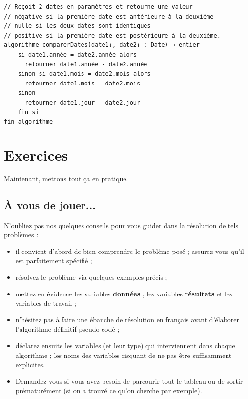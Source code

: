 \documentclass[11pt,a4paper]{article}
\begin{document}
            \par
        \begin{verbatim}
// Reçoit 2 dates en paramètres et retourne une valeur
// négative si la première date est antérieure à la deuxième
// nulle si les deux dates sont identiques
// positive si la première date est postérieure à la deuxième.
algorithme comparerDates(date1↓, date2↓ : Date) → entier
    si date1.année = date2.année alors
      retourner date1.année - date2.année
    sinon si date1.mois = date2.mois alors
      retourner date1.mois - date2.mois
    sinon
      retourner date1.jour - date2.jour
    fin si
fin algorithme
      \end{verbatim}\section{Exercices}
				Maintenant, mettons tout \c ca en pratique.
      
            \par
        \subsection{\`A vous de jouer...}
      N'oubliez pas nos quelques conseils pour vous guider dans la r\'esolution de tels probl\`emes :
      
					\begin{itemize}
				
			\item il convient d'abord de bien comprendre le probl\`eme pos\'e ; assurez-vous qu'il est parfaitement sp\'ecifi\'e ;
			\item r\'esolvez le probl\`eme via quelques exemples pr\'ecis ;
			\item mettez en \'evidence les variables \textbf{\guillemotleft  donn\'ees \guillemotright }, les variables \textbf{\guillemotleft  r\'esultats \guillemotright } et les variables de travail ;
			\item n'h\'esitez pas \`a faire une \'ebauche de r\'esolution en fran\c cais avant d'\'elaborer l'algorithme d\'efinitif pseudo-cod\'e ;
			\item d\'eclarez ensuite les variables (et leur type) qui interviennent dans chaque algorithme ; les noms des variables risquant de ne pas \^etre suffisamment explicites.
			\item Demandez-vous si vous avez besoin de parcourir tout le tableau ou de sortir pr\'ematur\'ement (si on a trouv\'e ce qu'on cherche par exemple).
					\end{itemize}
				
\end{document}
